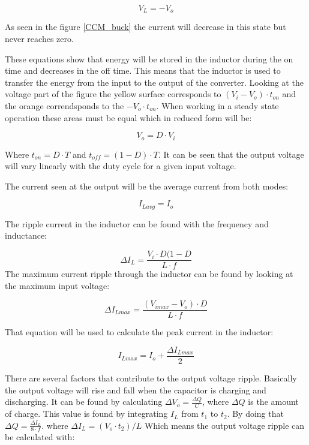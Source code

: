 \begin{equation}
V_L = -V_o
\end{equation} 

As seen in the figure \ref{CCM_buck} the current will decrease in this state but never reaches zero.

These equations show that energy will be stored in the inductor during the on time and decreases in the off time. This means that the inductor is used to transfer the energy from the input to the output of the converter. 
Looking at the voltage part of the figure the yellow surface corresponds to $(V_i-V_o)\cdot t_{on}$ and the orange correndsponds to the $-V_o\cdot t_{on}$. When working in a steady state operation these areas must be equal which in reduced form will be:

\begin{equation}
V_o = D\cdot V_i
\end{equation}

Where $t_{on}=D\cdot T$ and $t_{off}=(1-D)\cdot T$. It can be seen that the output voltage will vary linearly with the duty cycle for a given input voltage.

The current seen at the output will be the average current from both modes:

\begin{equation} \label{Iavg}
I_{Lavg}=I_o
\end{equation}

The ripple current in the inductor can be found with the frequency and inductance:

\begin{equation}\label{buckind}
\Delta I_L = \frac{V_i\cdot D(1-D}{L\cdot f}
\end{equation}
The maximum current ripple through the inductor can be found by looking at the maximum input voltage:

\begin{equation}
\Delta I_{Lmax} = \frac{(V_{imax}-V_{o})\cdot D}{L\cdot f}
\end{equation}

That equation will be used to calculate the peak current in the inductor:

\begin{equation}
I_{Lmax} = I_o + \frac{\Delta I_{Lmax}}{2}
\end{equation} 

There are several factors that contribute to the output voltage ripple. Basically the output voltage will rise and fall when the capacitor is charging and discharging. It can be found by calculating $\Delta V_o = \frac{\Delta Q}{C}$, where $\Delta Q$ is the amount of charge. This value is found by integrating $I_L$ from $t_1$ to $t_2$. By doing that $\Delta Q = \frac{\Delta I_L}{8\cdot f}$. where $\Delta I_L = (V_o\cdot t_2)/L$ Which means the output voltage ripple can be calculated with:
 
